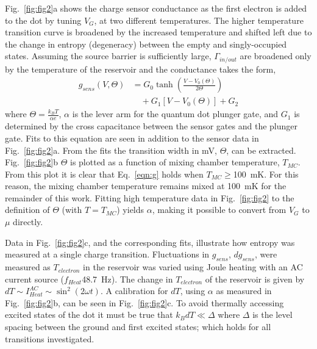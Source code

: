 \documentclass[twocolumn,showpacs,preprintnumbers,amsmath,amssymb,pra,aps,superscriptaddress]{revtex4-1}
\begin{document}
Fig.~\ref{fig:fig2}a shows the charge sensor conductance as the first electron is added to the dot by tuning $V_G$, at two different temperatures. The higher temperature transition curve is broadened by the increased temperature and shifted left due to the change in entropy (degeneracy)  between the empty and singly-occupied states. Assuming the source barrier is sufficiently large, $\Gamma_{in/out}$ are broadened only by the temperature of the reservoir and the conductance takes the form,
%
\begin{align}
\label{eqn:g}
        g_{sens}(V,\Theta) &= G_0 \tanh\left(\frac{V-V_0(\Theta)}{2\Theta}\right)  \\
                        &\quad + G_1\left[V-V_0(\Theta)\right] + G_2 \nonumber
\end{align}
%
where $\Theta = \frac{k_B T}{\alpha e}$, $\alpha$ is the lever arm for the quantum dot plunger gate, and $G_1$ is determined by the cross capacitance between the sensor gates and the plunger gate. Fits to this equation are seen in addition to the sensor data in Fig.~\ref{fig:fig2}a. From the fits the transition width in mV, $\Theta$, can be extracted. Fig.~\ref{fig:fig2}b $\Theta$ is plotted as a function of mixing chamber temperature, $T_{MC}$. From this plot it is clear that Eq.~\ref{eqn:g} holds when $T_{MC}\geq$\SI{100}{\milli\kelvin}. For this reason, the mixing chamber temperature remains mixed at \SI{100}{\milli\kelvin} for the remainder of this work. Fitting high temperature data in Fig.~\ref{fig:fig2} to the definition of $\Theta$ (with $T=T_{MC}$) yields $\alpha$, making it possible to convert from $V_G$ to $\mu$ directly.

Data in Fig.~\ref{fig:fig2}c, and the corresponding fits, illustrate how entropy was measured at a single charge transition. Fluctuations in $g_{sens}$, $dg_{sens}$, were measured as $T_{electron}$ in the reservoir was varied using Joule heating with an AC current source ($f_{Heat}$\SI{48.7}{\hertz}). The change in $T_{electron}$ of the reservoir is given by $dT \sim I^{AC}_{Heat} \sim \sin^2(2\omega t)$. A calibration for $dT$, using $\alpha$ as measured in Fig.~\ref{fig:fig2}b, can be seen in Fig.~\ref{fig:fig2}c. To avoid thermally accessing excited states of the dot it must be true that $k_B dT \ll \Delta$ where $\Delta$ is the level spacing between the ground and first excited states; which holds for all transitions investigated. 
\end{document}
